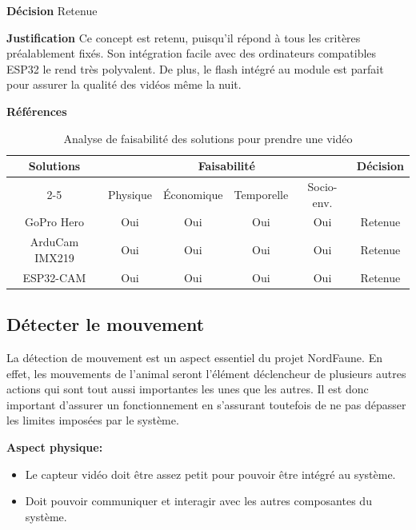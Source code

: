 \noindent\textbf{Décision} Retenue
\smallskip

\noindent\textbf{Justification} Ce concept est retenu, puisqu'il répond à tous les critères préalablement fixés. Son intégration facile avec des ordinateurs compatibles ESP32 le rend très polyvalent. De plus, le flash intégré au module est parfait pour assurer la qualité des vidéos même la nuit.
\smallskip

\noindent\textbf{Références} 
\cite{ArduCam1}
\cite{ArduCam2}

\begin{table}[H]
    \centering
\begin{tabular}{|c|c|c|c|c|c|}
    \hline
    \centering
    \textbf{Solutions} & \multicolumn{4}{c|}{Faisabilité} & \textbf{Décision} \\
    \cline{2-5}
    & Physique & Économique & Temporelle & Socio-env. & \\
    \hline
    GoPro Hero & Oui & Oui & Oui & Oui & Retenue \\
    \hline
    ArduCam IMX219 & Oui & Oui & Oui & Oui & Retenue \\
    \hline
    ESP32-CAM & Oui & Oui & Oui & Oui & Retenue \\
    \hline
\end{tabular}
\caption{Analyse de faisabilité des solutions pour prendre une vidéo}
\label{tab:faisabiliteVideo}
\end{table}

\subsection{Détecter le mouvement}
\label{DétecterLeMouvement}
La détection de mouvement est un aspect essentiel du projet NordFaune. En effet, les mouvements de l’animal seront l’élément déclencheur de plusieurs autres actions qui sont tout aussi importantes les unes que les autres. Il est donc important d’assurer un fonctionnement en s'assurant toutefois de ne pas dépasser les limites imposées par le système.
\bigskip

\noindent\textbf{Aspect physique:}
\begin{itemize}
    \item Le capteur vidéo doit être assez petit pour pouvoir être intégré au système.
    \item Doit pouvoir communiquer et interagir avec les autres composantes du système.  
\end{itemize}

